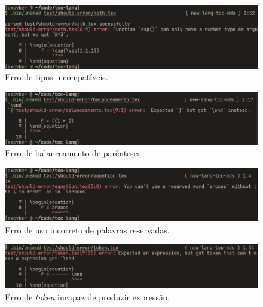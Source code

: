 \begin{figure}[H]
    \caption{\label{error-incompatible-types} \small Erro de tipos incompatíveis.}
    \begin{center}
        \includegraphics[scale=0.5]{./Imagens/error-incompatible-types.png}
    \end{center}
\end{figure}


\begin{figure}[H]
    \caption{\label{error-balanceamento} \small Erro de balanceamento de parênteses.}
    \begin{center}
        \includegraphics[scale=0.5]{./Imagens/error-balanceamento.png}
    \end{center}
\end{figure}

\begin{figure}[H]
    \caption{\label{error-reserved-word} \small Erro de uso incorreto de palavras reservadas.}
    \begin{center}
        \includegraphics[scale=0.5]{./Imagens/error-reserved-word.png}
    \end{center}
\end{figure}


\begin{figure}[H]
    \caption{\label{error-cant-make-expression} \small Erro de \textit{token} incapaz de produzir expressão.}
    \begin{center}
        \includegraphics[scale=0.5]{./Imagens/error-cant-make-expression.png}
    \end{center}
\end{figure}

